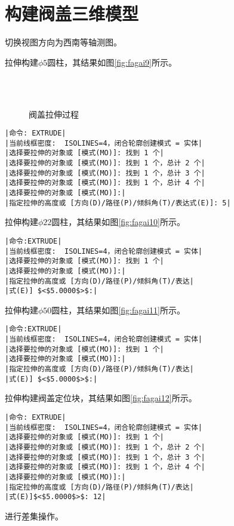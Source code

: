 \section{构建阀盖三维模型}
\begin{procedure}
\item 切换视图方向为西南等轴测图。
\item 拉伸构建$\phi 5$圆柱，其结果如图\ref{fig:fagai9}所示。
\begin{figure}[htbp]
\centering
{}\hspace{30pt}
\\
\hspace{30pt}
\\
\caption{阀盖拉伸过程}
\end{figure}
\begin{lstlisting}
|命令: EXTRUDE|
|当前线框密度:  ISOLINES=4，闭合轮廓创建模式 = 实体|
|选择要拉伸的对象或 [模式(MO)]: 找到 1 个|
|选择要拉伸的对象或 [模式(MO)]: 找到 1 个，总计 2 个|
|选择要拉伸的对象或 [模式(MO)]: 找到 1 个，总计 3 个|
|选择要拉伸的对象或 [模式(MO)]: 找到 1 个，总计 4 个|
|选择要拉伸的对象或 [模式(MO)]:|
|指定拉伸的高度或 [方向(D)/路径(P)/倾斜角(T)/表达式(E)]: 5|
\end{lstlisting}

\item 拉伸构建$\phi 22$圆柱，其结果如图\ref{fig:fagai10}所示。
\begin{lstlisting}
|命令:EXTRUDE|
|当前线框密度:  ISOLINES=4，闭合轮廓创建模式 = 实体|
|选择要拉伸的对象或 [模式(MO)]: 找到 1 个|
|选择要拉伸的对象或 [模式(MO)]:|
|指定拉伸的高度或 [方向(D)/路径(P)/倾斜角(T)/表达|
|式(E)] $<$5.0000$>$:|
\end{lstlisting}
\item 拉伸构建$\phi 50$圆柱，其结果如图\ref{fig:fagai11}所示。
\begin{lstlisting}
|命令:EXTRUDE|
|当前线框密度:  ISOLINES=4，闭合轮廓创建模式 = 实体|
|选择要拉伸的对象或 [模式(MO)]: 找到 1 个|
|选择要拉伸的对象或 [模式(MO)]:|
|指定拉伸的高度或 [方向(D)/路径(P)/倾斜角(T)/表达|
|式(E)] $<$5.0000$>$:|
\end{lstlisting}
\item 拉伸构建阀盖定位块，其结果如图\ref{fig:fagai12}所示。
\begin{lstlisting}
|命令: EXTRUDE|
|当前线框密度:  ISOLINES=4，闭合轮廓创建模式 = 实体|
|选择要拉伸的对象或 [模式(MO)]: 找到 1 个|
|选择要拉伸的对象或 [模式(MO)]: 找到 1 个，总计 2 个|
|选择要拉伸的对象或 [模式(MO)]: 找到 1 个，总计 3 个|
|选择要拉伸的对象或 [模式(MO)]: 找到 1 个，总计 4 个|
|选择要拉伸的对象或 [模式(MO)]:|
|指定拉伸的高度或 [方向(D)/路径(P)/倾斜角(T)/表达|
|式(E)]$<$5.0000$>$: 12|
\end{lstlisting}
\item 进行差集操作。


\end{procedure}
